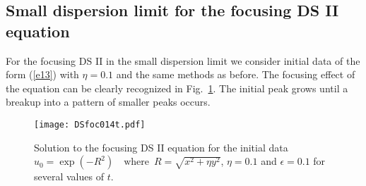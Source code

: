 \documentclass[final]{siamltex}
\begin{document}
\subsection{Small dispersion limit for the focusing DS II equation}

For the focusing DS II in the small dispersion limit we consider initial data of the form
(\ref{e13}) with $\eta=0.1$
and the same methods as before. The focusing effect of the equation 
can be clearly recognized  in Fig.~\ref{figDSfoc}. The initial peak 
grows until a breakup into a pattern of smaller peaks occurs.
\begin{figure}[htb!]
  \centering
 \texttt{[image: DSfoc014t.pdf]}
 \caption{Solution to the focusing DS II equation for the initial 
 data $u_{0}=\exp(-R^{2})\,\,\,\,\,\,
\mbox{where}\,\,\, R=\sqrt{x^{2}+\eta y^{2}}$, $\eta=0.1$  and $\epsilon=0.1$ for several values of $t$.}
   \label{figDSfoc}
\end{figure}
\end{document}
